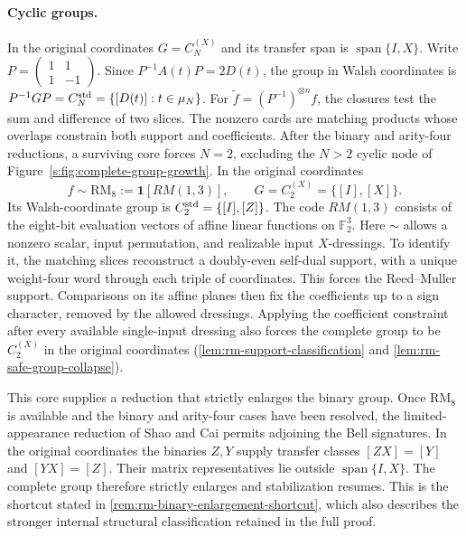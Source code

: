 \documentclass[11pt,letterpaper,onecolumn]{article}
\theoremstyle{plain}
\theoremstyle{definition}
\theoremstyle{remark}
\newcommand{\Ftwo}{\mathbb F_2}
\newcommand{\CycX}[1]{{C_{#1}^{(X)}}}
\newcommand{\Span}{\operatorname{span}}
\newcommand{\one}{\mathbf 1}
\newcommand{\RMcore}{\mathrm{RM}_8}
\begin{document}
\paragraph{Cyclic groups.}
In the original coordinates \(G=\CycX{N}\) and its transfer span is
\(\Span\{I,X\}\). Write \(P=\left(\begin{smallmatrix}1&1\\1&-1\end{smallmatrix}\right)\).
Since \(P^{-1}A(t)P=2D(t)\), the group in Walsh coordinates is
\(P^{-1}GP=C_N^{\rm std}=\{[D(t)]:t\in\mu_N\}\).
For \(\widetilde f=(P^{-1})^{\otimes n}f\), the closures test the
sum and difference of two slices. The nonzero cards are matching
products whose overlaps constrain both support and coefficients.
After the binary and arity-four reductions, a surviving core forces
\(N=2\), excluding the \(N>2\) cyclic node of
Figure~\ref{s:fig:complete-group-growth}. In the original coordinates
\[
 f\sim\RMcore:=\one[RM(1,3)],\qquad G=\CycX{2}=\{[I],[X]\}.
\]
Its Walsh-coordinate group is \(C_2^{\rm std}=\{[I],[Z]\}\).
The code \(RM(1,3)\) consists of the eight-bit evaluation vectors of
affine linear functions on \(\Ftwo^3\). Here \(\sim\) allows a nonzero
scalar, input permutation, and realizable input \(X\)-dressings.
To identify it, the matching slices reconstruct a doubly-even self-dual
support, with a unique weight-four word through each triple of
coordinates. This forces the Reed--Muller support. Comparisons on its
affine planes then fix the coefficients up to a sign character, removed
by the allowed dressings. Applying the coefficient constraint after
every available single-input dressing also forces the complete group
to be \(\CycX{2}\) in the original coordinates (\cref{lem:rm-support-classification}
and \cref{lem:rm-safe-group-collapse}).

This core supplies a reduction that strictly enlarges the binary group. Once \(\RMcore\) is available and the binary and arity-four
cases have been resolved, the limited-appearance reduction of Shao and
Cai \cite[full version, Section~8.2, Lemmas~8.9--8.10]{ShaoCai2020}
permits adjoining the Bell signatures. In the original coordinates the binaries
\(Z,Y\) supply transfer classes \([ZX]=[Y]\) and \([YX]=[Z]\).
Their matrix representatives lie outside \(\Span\{I,X\}\). The complete group therefore strictly enlarges
and stabilization resumes. This is the shortcut stated in \cref{rem:rm-binary-enlargement-shortcut}, which also describes
the stronger internal structural classification retained in the full proof.
\end{document}
